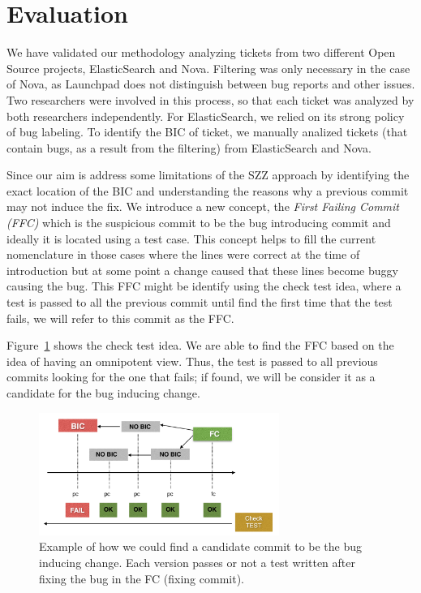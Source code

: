 \documentclass[conference]{IEEEtran}
\begin{document}
\section{Evaluation} 
We have validated our methodology analyzing tickets from two different Open Source projects, ElasticSearch and Nova. Filtering was only necessary in the case of Nova, as Launchpad does not distinguish between bug reports and other issues. Two researchers were involved in this process, so that each ticket was analyzed by both researchers independently. For ElasticSearch, we relied on its strong policy of bug labeling. To identify the BIC of ticket, we manually analized tickets (that contain bugs, as a result from the filtering) from ElasticSearch and Nova.

Since our aim is address some limitations of the SZZ approach by identifying the exact location of the BIC and understanding the reasons why a previous commit may not induce the fix. We introduce a new concept, the \emph{First Failing Commit (FFC)} which is the suspicious commit to be the bug introducing commit and ideally it is located using a test case. This concept helps to fill the current nomenclature in those cases where the lines were correct at the time of introduction but at some point a change caused that these lines become buggy causing the bug. This FFC might be identify using the check test idea, where a test is passed to all the previous commit until find the first time that the test fails, we will refer to this commit as the FFC.


Figure~\ref{fig:test} shows the check test idea. We are able to find the FFC based on the idea of having an omnipotent view. Thus, the test is passed to all previous commits looking for the one that fails; if found, we will be consider it as a candidate for the bug inducing change.

\begin{figure}[ht]
\centering
\includegraphics[height=4cm]{testrecursive.png}
\caption{Example of how we could find a candidate commit to be the  bug inducing change. Each version passes or not a test written after fixing the bug in the FC (fixing commit).}
\label{fig:test}      
\end{figure}
\end{document}

